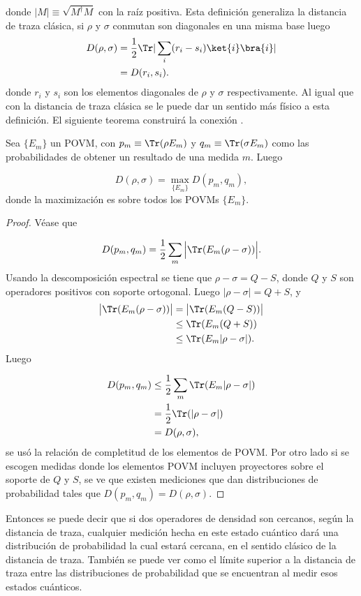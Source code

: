 donde $|M| \equiv \sqrt{M^{\dagger}M}$ con la raíz positiva. Esta definición generaliza la distancia de traza clásica, si $\rho$ y $\sigma$ conmutan son diagonales en una misma base luego
\begin{align*}
D(\rho,\sigma) &= \frac{1}{2} \Tr |\sum_{i} (r_{i}-s_{i})\ket{i}\bra{i}|\\
\quad &= D(r_{i},s_{i}).
\end{align*}
donde $r_{i}$ y $s_{i}$ son los elementos diagonales de $\rho$ y $\sigma$ respectivamente. Al igual que con la distancia de traza clásica se le puede dar un sentido más físico a esta definición. El siguiente teorema construirá la conexión \cite{NielsenInformation}.
\begin{theorem}
Sea $\{ E_{m}\}$ un POVM, con  $p_{m} \equiv \Tr(\rho E_{m})$  y  $q_{m}\equiv \Tr(\sigma E_{m})$ como las probabilidades de obtener un resultado de una medida $m$. Luego

\begin{equation}
D(\rho,\sigma)= \max_{ \{ E_{m}\} } D(p_{m},q_{m}),
\end{equation}
donde la maximización es sobre todos los POVMs $\{ E_{m}\}$.
\end{theorem}

\begin{proof}

Véase que 

\begin{equation}
D(p_{m},q_{m})= \frac{1}{2} \sum_{m} \Big|\Tr(E_{m}(\rho- \sigma)) \Big|.
\end{equation}
Usando la descomposición espectral se tiene que $\rho- \sigma=Q-S$, donde $Q$ y $S$ son operadores positivos con soporte ortogonal. Luego $|\rho - \sigma|= Q+S$, y
\begin{align}
\big|\Tr(E_{m}(\rho- \sigma)) \big| &= \big|\Tr(E_{m}(Q-S)) \big| \\
\quad &\leq \Tr(E_{m}(Q+S))\\
\quad &\leq \Tr(E_{m}|\rho -\sigma|).
\end{align}
Luego 

\begin{align}
D(p_{m},q_{m}) &\leq \frac{1}{2} \sum_{m} \Tr(E_{m}|\rho-\sigma|)\\
\quad &= \frac{1}{2} \Tr(|\rho -\sigma|)\\
\quad &= D(\rho,\sigma),
\end{align}
se usó la relación de completitud de los elementos de POVM. Por otro lado si se escogen medidas donde los elementos POVM incluyen proyectores sobre el soporte de $Q$ y $S$, se ve que existen mediciones que dan distribuciones de probabilidad tales que $D(p_{m},q_{m})= D(\rho,\sigma)$.

\end{proof}

Entonces se puede decir que si dos operadores de densidad son cercanos, según la distancia de traza, cualquier medición hecha en este estado cuántico dará una distribución de probabilidad la cual estará cercana, en el sentido clásico de la distancia de traza. También se puede ver como el límite superior a la distancia de traza entre las distribuciones de probabilidad que se encuentran al medir esos estados cuánticos.

